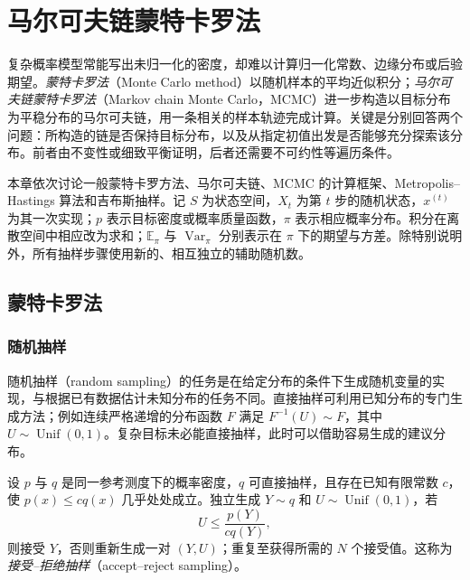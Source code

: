 \setcounter{chapter}{17} %
\chapter{马尔可夫链蒙特卡罗法}
\label{ch:lh-mcmc}

复杂概率模型常能写出未归一化的密度，却难以计算归一化常数、边缘分布或后验期望。\emph{蒙特卡罗法}（Monte Carlo method）以随机样本的平均近似积分；\emph{马尔可夫链蒙特卡罗法}（Markov chain Monte Carlo，MCMC）进一步构造以目标分布为平稳分布的马尔可夫链，用一条相关的样本轨迹完成计算。关键是分别回答两个问题：所构造的链是否保持目标分布，以及从指定初值出发是否能够充分探索该分布。前者由不变性或细致平衡证明，后者还需要不可约性等遍历条件。

本章依次讨论一般蒙特卡罗方法、马尔可夫链、MCMC 的计算框架、Metropolis--Hastings 算法和吉布斯抽样。记 $S$ 为状态空间，$X_t$ 为第 $t$ 步的随机状态，$x^{(t)}$ 为其一次实现；$p$ 表示目标密度或概率质量函数，$\pi$ 表示相应概率分布。积分在离散空间中相应改为求和；$\mathbb E_\pi$ 与 $\operatorname{Var}_\pi$ 分别表示在 $\pi$ 下的期望与方差。除特别说明外，所有抽样步骤使用新的、相互独立的辅助随机数。

\section{蒙特卡罗法}
\label{sec:lh-mcmc-monte-carlo}

\subsection{随机抽样}
\label{subsec:lh-mcmc-random-sampling}

随机抽样（random sampling）的任务是在给定分布的条件下生成随机变量的实现，与根据已有数据估计未知分布的任务不同。直接抽样可利用已知分布的专门生成方法；例如连续严格递增的分布函数 $F$ 满足 $F^{-1}(U)\sim F$，其中 $U\sim\operatorname{Unif}(0,1)$。复杂目标未必能直接抽样，此时可以借助容易生成的建议分布。

\begin{definition}[接受--拒绝抽样]
\label{def:lh-mcmc-rejection}
设 $p$ 与 $q$ 是同一参考测度下的概率密度，$q$ 可直接抽样，且存在已知有限常数 $c$，使 $p(x)\leq c q(x)$ 几乎处处成立。独立生成 $Y\sim q$ 和 $U\sim\operatorname{Unif}(0,1)$，若
\begin{equation}
U\leq\frac{p(Y)}{c q(Y)},
\label{eq:lh-mcmc-rejection-rule}
\end{equation}
则接受 $Y$，否则重新生成一对 $(Y,U)$；重复至获得所需的 $N$ 个接受值。这称为\emph{接受--拒绝抽样}（accept--reject sampling）。
\end{definition}


